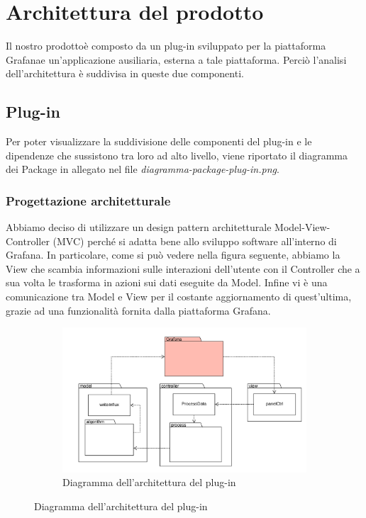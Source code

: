 \section{Architettura del prodotto}
Il nostro prodotto\glosp è composto da un plug-in sviluppato per la piattaforma Grafana\glosp e un'applicazione ausiliaria, esterna a tale piattaforma. Perciò l'analisi dell'architettura è suddivisa in queste due componenti.
\subsection{Plug-in}
Per poter visualizzare la suddivisione delle componenti del plug-in e le dipendenze che sussistono tra loro ad alto livello, viene riportato il diagramma dei Package in allegato nel file \textit{diagramma-package-plug-in.png}.
\subsubsection{Progettazione architetturale}
Abbiamo deciso di utilizzare un design pattern architetturale Model-View-Controller (MVC) perché si adatta bene allo sviluppo software all'interno di Grafana\glo. In particolare, come si può vedere nella figura seguente, abbiamo la View che scambia informazioni sulle interazioni dell'utente con il Controller che a sua volta le trasforma in azioni sui dati eseguite da Model. Infine vi è una comunicazione tra Model e View per il costante aggiornamento di quest'ultima, grazie ad una funzionalità fornita dalla piattaforma Grafana\glo.
\mbox{}
\begin{landscape}
	\begin{figure}
		\begin{figure} [H]
			\includegraphics[width=\linewidth]{./img/Diagrammi/architettura-plug-in.png}
			\caption{Diagramma dell'architettura del plug-in}
		\end{figure}
	\end{figure}
\end{landscape}
